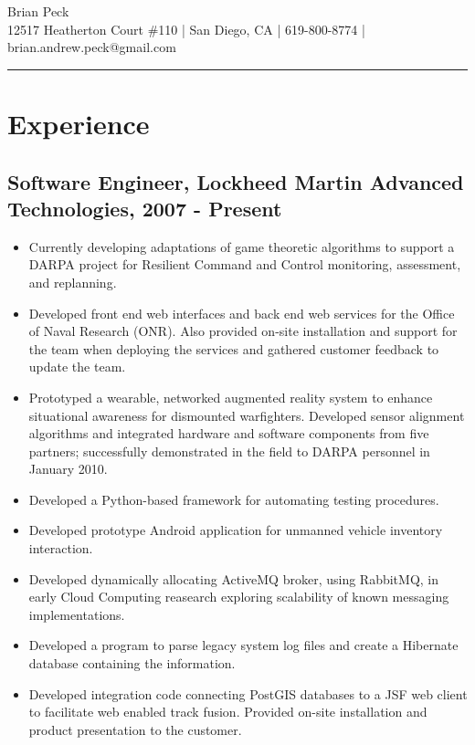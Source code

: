 \documentclass[11pt]{article}
\title{}
\date{}
\begin{document}
\begin{center}
{\huge Brian Peck} \\
12517 Heatherton Court \#110 | San Diego, CA | 619-800-8774 | brian.andrew.peck@gmail.com
\hrule
\end{center}

\section*{Experience}
\label{sec-1}

\subsection*{Software Engineer, Lockheed Martin Advanced Technologies, 2007 - Present}
\label{sec-1.1}

\begin{itemize}
\item Currently developing adaptations of game theoretic algorithms to support a DARPA project for Resilient Command and Control monitoring, assessment, and replanning.
\item Developed front end web interfaces and back end web services for the Office of Naval Research (ONR). Also provided on-site installation and support for the team when deploying the services and gathered customer feedback to update the team.
\item Prototyped a wearable, networked augmented reality system to enhance situational awareness for dismounted warfighters.  Developed sensor alignment algorithms and integrated hardware and software components from five partners; successfully demonstrated in the field to DARPA personnel in January 2010.
\item Developed a Python-based framework for automating testing procedures.
\item Developed prototype Android application for unmanned vehicle inventory interaction.
\item Developed dynamically allocating ActiveMQ broker, using RabbitMQ, in early Cloud Computing reasearch exploring scalability of known messaging implementations.
\item Developed a program to parse legacy system log files and create a Hibernate database containing the information.
\item Developed integration code connecting PostGIS databases to a JSF web client to facilitate web enabled track fusion. Provided on-site installation and product presentation to the customer.
\end{itemize}
\end{document}
